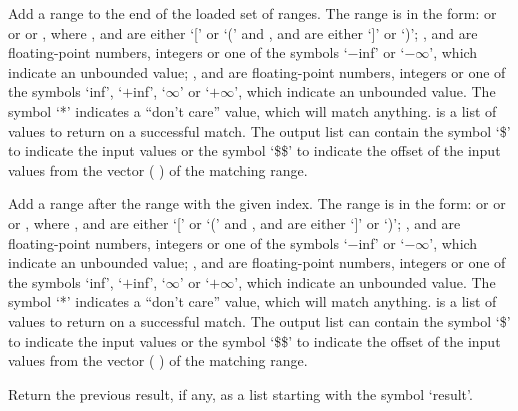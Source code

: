   Add a range to the end of the loaded set of ranges.
  The range is in the form:  or   or   or , where
  ,  and  are either `[' or `(' and ,  and  are
  either `]' or `)';
  ,  and  are floating-point numbers, integers or one of the symbols `$-$inf' or
  `$-\infty$', which indicate an unbounded value;
  ,  and  are floating-point numbers, integers or one of the symbols `inf', `$+$inf',
  `$\infty$' or `$+\infty$', which indicate an unbounded value.
  The symbol `*' indicates a ``don't care'' value, which will match anything.
   is a list of values to return on a successful match.
  The output list can contain the symbol `\$' to indicate the input values or the symbol `\$\$' to
  indicate the offset of the input values from the vector (  ) of the
  matching range.
  
  Add a range after the range with the given index.
  The range is in the form:  or   or   or , where
  ,  and  are either `[' or `(' and ,  and  are
  either `]' or `)';
  ,  and  are floating-point numbers, integers or one of the symbols `$-$inf' or
  `$-\infty$', which indicate an unbounded value;
  ,  and  are floating-point numbers, integers or one of the symbols `inf', `$+$inf',
  `$\infty$' or `$+\infty$', which indicate an unbounded value.
  The symbol `*' indicates a ``don't care'' value, which will match anything.
   is a list of values to return on a successful match.
  The output list can contain the symbol `\$' to indicate the input values or the symbol `\$\$' to
  indicate the offset of the input values from the vector (  ) of the
  matching range.

  Return the previous result, if any, as a list starting with the symbol `result'.

